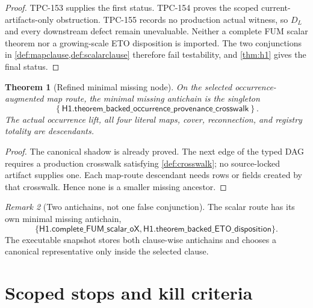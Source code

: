 \documentclass[11pt]{article}
\newtheorem{theorem}{Theorem}[section]
\theoremstyle{definition}
\theoremstyle{remark}
\newtheorem{remark}[theorem]{Remark}
\numberwithin{equation}{section}
\begin{document}
\begin{proof}
TPC-153 supplies the first status.  TPC-154 proves the scoped
current-artifacts-only obstruction.  TPC-155 records no production
actual witness, so \(D_L\) and every downstream defect remain
unevaluable.  Neither a complete FUM scalar theorem nor a
growing-scale ETO disposition is imported.  The two conjunctions in
\cref{def:mapclause,def:scalarclause} therefore fail testability, and
\cref{thm:h1} gives the final status.
\end{proof}

\begin{theorem}[Refined minimal missing node]
\label{thm:pointer}
On the selected occurrence-augmented map route, the minimal missing
antichain is the singleton
\[
 \boxed{
 \left\{
 \mathsf{H1.theorem\_backed\_occurrence\_provenance\_crosswalk}
 \right\}.}
\]
The actual occurrence lift, all four literal maps, cover,
reconnection, and registry totality are descendants.
\end{theorem}

\begin{proof}
The canonical shadow is already proved.  The next edge of the typed
DAG requires a production crosswalk satisfying
\cref{def:crosswalk}; no source-locked artifact supplies one.  Each
map-route descendant needs rows or fields created by that crosswalk.
Hence none is a smaller missing ancestor.
\end{proof}

\begin{remark}[Two antichains, not one false conjunction]
The scalar route has its own minimal missing antichain,
\[
 \{
 \mathsf{H1.complete\_FUM\_scalar\_oX},
 \mathsf{H1.theorem\_backed\_ETO\_disposition}
 \}.
\]
The executable snapshot stores both clause-wise antichains and
chooses a canonical representative only inside the selected clause.
\end{remark}

\section{Scoped stops and kill criteria}
\end{document}
